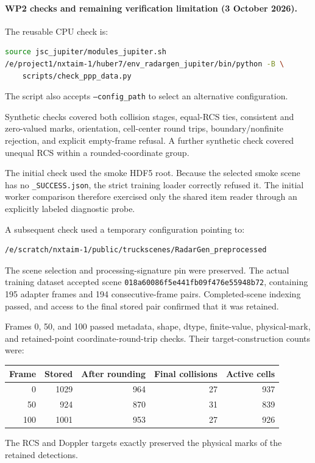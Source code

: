 \documentclass[11pt,a4paper]{article}
\begin{document}
\paragraph{WP2 checks and remaining verification limitation
(3 October 2026).}
The reusable CPU check is:
\begin{lstlisting}[language=bash]
source jsc_jupiter/modules_jupiter.sh
/e/project1/nxtaim-1/huber7/env_radargen_jupiter/bin/python -B \
    scripts/check_ppp_data.py
\end{lstlisting}
The script also accepts \texttt{--config\_path} to select an
alternative configuration.

Synthetic checks covered both collision stages, equal-RCS ties,
consistent and zero-valued marks, orientation, cell-center round trips,
boundary/nonfinite rejection, and explicit empty-frame refusal.
A further synthetic check covered unequal RCS within a
rounded-coordinate group.

The initial check used the smoke HDF5 root.
Because the selected smoke scene has no \texttt{\_SUCCESS.json},
the strict training loader correctly refused it.
The initial worker comparison therefore exercised only the shared
item reader through an explicitly labeled diagnostic probe.

A subsequent check used a temporary configuration pointing to:
\begin{lstlisting}
/e/scratch/nxtaim-1/public/truckscenes/RadarGen_preprocessed
\end{lstlisting}
The scene selection and processing-signature pin were preserved.
The actual training dataset accepted scene
\texttt{018a60086f5e441fb09f476e55948b72}, containing 195 adapter
frames and 194 consecutive-frame pairs.
Completed-scene indexing passed, and access to the final stored
pair confirmed that it was retained.

Frames 0, 50, and 100 passed metadata, shape, dtype, finite-value,
physical-mark, and retained-point coordinate-round-trip checks.
Their target-construction counts were:
\begin{center}
\begin{tabular}{rrrrr}
\hline
Frame & Stored & After rounding & Final collisions & Active cells \\
\hline
0   & 1029 & 964 & 27 & 937 \\
50  & 924  & 870 & 31 & 839 \\
100 & 1001 & 953 & 27 & 926 \\
\hline
\end{tabular}
\end{center}
The RCS and Doppler targets exactly preserved the physical marks
of the retained detections.
\end{document}
